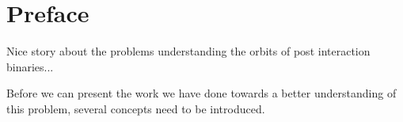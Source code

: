 \chapter*{Preface}                                  \label{ch:preface}

Nice story about the problems understanding the orbits of post interaction binaries...

Before we can present the work we have done towards a better understanding of this problem, several concepts need to be introduced. 


\cleardoublepage

